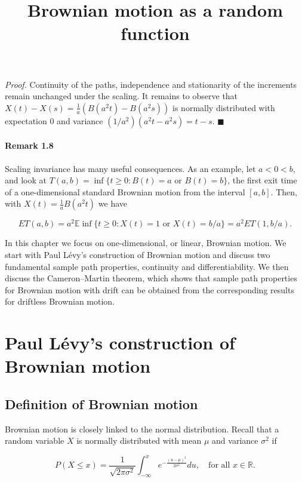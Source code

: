 \documentclass{article}
\begin{document}
\textit{Proof.} Continuity of the paths, independence and stationarity of the increments remain unchanged under the scaling. It remains to observe that $X(t) - X(s) = \frac{1}{a} (B(a^2 t) - B(a^2 s))$ is normally distributed with expectation 0 and variance $(1/a^2)(a^2 t - a^2 s) = t - s$. \hfill $\blacksquare$

\paragraph{Remark 1.8} Scaling invariance has many useful consequences. As an example, let $a < 0 < b$, and look at $T(a, b) = \inf \{t \geq 0 : B(t) = a \text{ or } B(t) = b\}$, the first exit time of a one-dimensional standard Brownian motion from the interval $[a, b]$. Then, with $X(t) = \frac{1}{a}B(a^2 t)$ we have

\[
ET(a, b) = a^2 \mathbb{E} \inf \{t \geq 0 : X(t) = 1 \text{ or } X(t) = b/a\} = a^2 ET(1, b/a).
\]







\title{Brownian motion as a random function}
\maketitle

In this chapter we focus on one-dimensional, or linear, Brownian motion. We start with Paul Lévy's construction of Brownian motion and discuss two fundamental sample path properties, continuity and differentiability. We then discuss the Cameron–Martin theorem, which shows that sample path properties for Brownian motion with drift can be obtained from the corresponding results for driftless Brownian motion.

\section{Paul Lévy's construction of Brownian motion}

\subsection{Definition of Brownian motion}

Brownian motion is closely linked to the normal distribution. Recall that a random variable $X$ is normally distributed with mean $\mu$ and variance $\sigma^2$ if

\[
P(X \leq x) = \frac{1}{\sqrt{2\pi\sigma^2}} \int_{-\infty}^{x} e^{-\frac{(u-\mu)^2}{2\sigma^2}} du, \quad \text{for all } x \in \mathbb{R}.
\]
\end{document}
